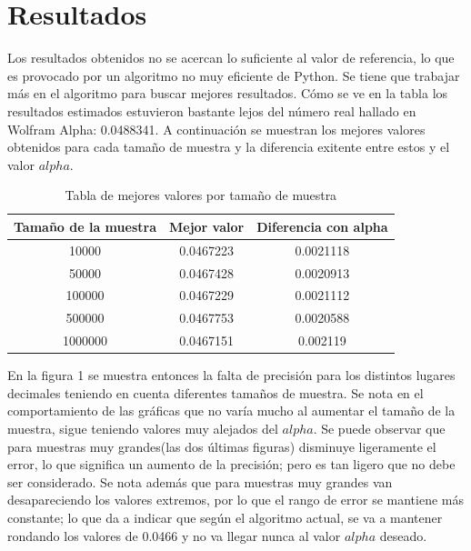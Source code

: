 \documentclass{article}
\begin{document}
\section{Resultados}
Los resultados obtenidos no se acercan lo suficiente al valor de referencia, lo que es provocado por un algoritmo no muy eficiente de Python. Se tiene que trabajar más en el algoritmo para buscar mejores resultados. Cómo se ve en la tabla los resultados estimados estuvieron bastante lejos del número real hallado en Wolfram Alpha: 0.0488341.  A continuación se muestran los mejores valores obtenidos para cada tamaño de muestra y la diferencia exitente entre estos y el valor $alpha$. 

\begin{table}[H]
\centering
\caption{Tabla de mejores valores por tamaño de muestra}
\begin{tabular}{|c|c|c|}
	\hline
	Tamaño de la muestra & Mejor valor & Diferencia con alpha \\
	\hline
		10000 & 0.0467223 & 0.0021118 \\
	\hline
	50000 & 0.0467428 & 0.0020913 \\
	\hline
	100000 & 0.0467229 & 0.0021112 \\
	\hline
	500000 & 0.0467753 & 0.0020588 \\
	\hline
	1000000 & 0.0467151 & 0.002119 \\
	\hline
\end{tabular}
\end{table}

En la figura 1 se muestra entonces la falta de precisión para los distintos lugares decimales teniendo en cuenta diferentes tamaños de muestra. Se nota en el comportamiento de las gráficas que no varía mucho al aumentar el tamaño de la muestra, sigue teniendo valores muy alejados del $alpha$. Se puede observar que para muestras muy grandes(las dos últimas figuras) disminuye ligeramente el error, lo que significa un aumento de la precisión; pero es tan ligero que no debe ser considerado. Se nota además que para muestras muy grandes van desapareciendo los valores extremos, por lo que el rango de error se mantiene más constante; lo que da a indicar que según el algoritmo actual, se va a mantener rondando los valores de 0.0466 y no va llegar nunca al valor $alpha$ deseado. 
\end{document}
